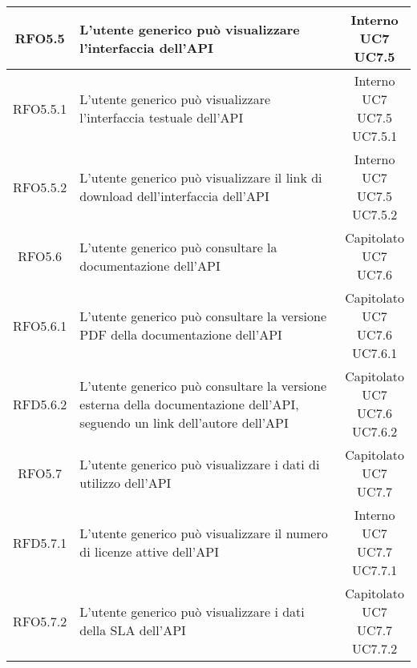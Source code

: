 \begin{longtable}{|c|p{8cm}|c|}
\hypertarget{RFO5.5}{RFO5.5} & L'utente generico può visualizzare l'interfaccia dell'API & \makecell*{Interno\\UC7\\UC7.5} \\
\hline
\hypertarget{RFO5.5.1}{RFO5.5.1} & L'utente generico può visualizzare l'interfaccia testuale dell'API & \makecell*{Interno\\UC7\\UC7.5\\UC7.5.1} \\
\hline
\hypertarget{RFO5.5.2}{RFO5.5.2} & L'utente generico può visualizzare il link di download dell'interfaccia dell'API & \makecell*{Interno\\UC7\\UC7.5\\UC7.5.2} \\
\hline

\hypertarget{RFO5.6}{RFO5.6} & L'utente generico può consultare la documentazione dell'API & \makecell*{Capitolato\\UC7\\UC7.6} \\
\hline
\hypertarget{RFO5.6.1}{RFO5.6.1} & L'utente generico può consultare la versione PDF della documentazione dell'API & \makecell*{Capitolato\\UC7\\UC7.6\\UC7.6.1} \\
\hline
\hypertarget{RFD5.6.2}{RFD5.6.2} & L'utente generico può consultare la versione esterna della documentazione dell'API, seguendo un link dell'autore dell'API  & \makecell*{Capitolato\\UC7\\UC7.6\\UC7.6.2} \\
\hline

\hypertarget{RFO5.7}{RFO5.7} & L'utente generico può visualizzare i dati di utilizzo dell'API & \makecell*{Capitolato\\UC7\\UC7.7} \\
\hline
\hypertarget{RFD5.7.1}{RFD5.7.1} & L'utente generico può visualizzare il numero di licenze attive dell'API & \makecell*{Interno\\UC7\\UC7.7\\UC7.7.1} \\
\hline
\hypertarget{RFO5.7.2}{RFO5.7.2} & L'utente generico può visualizzare i dati della SLA dell'API & \makecell*{Capitolato\\UC7\\UC7.7\\UC7.7.2} \\
\hline


\end{longtable}
